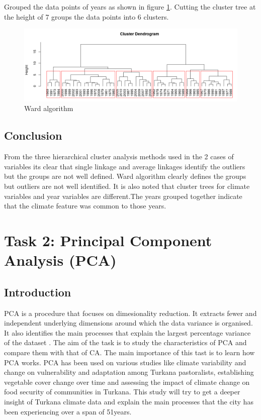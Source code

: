\documentclass[12pt,a4paper]{article}
\begin{document}
\begin{enumerate}[label=\roman*)]
\noindent Grouped the data points of years as shown in figure \ref{fig:w2}.
Cutting the cluster tree at the height of 7 groups the data points into 6 clusters.

\begin{figure}[h]
	\centering
	\includegraphics[width=0.7\linewidth]{w2}
	\caption{Ward algorithm}
	\label{fig:w2}
\end{figure}

\subsection{Conclusion}
\noindent From the three hierarchical cluster analysis methods used in the 2 cases of variables its clear that single linkage and average linkages identify the outliers but the groups are not well defined. Ward algorithm clearly defines the groups but outliers are not well identified. It is also noted that cluster trees for climate variables and year variables are different.The years grouped together indicate that the climate feature was common to those years.
\end{enumerate}

\newpage
\section{Task 2: Principal Component Analysis (PCA)}
\subsection{Introduction}

PCA is a procedure that focuses on dimesionality reduction. It extracts fewer and independent underlying dimensions around which the data variance is organised. It also identifies the main processes that explain the largest percentage variance of the dataset \cite{jolliffe1990principal}. The aim of the task is to study the characteristics of PCA and compare them with that of CA. The main importance of this tast is to learn how PCA works.  PCA has been used on various studies like climate variability and change on vulnerability and adaptation among Turkana pastoralists, establishing vegetable cover change over time and assessing the impact of climate change on food security of communities in Turkana. This study will try to get a deeper insight of Turkana climate data and explain the main processes that the city has been experiencing over a span of 51years.
\end{document}
